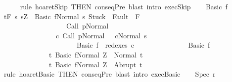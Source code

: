 \begin{isabellebody}
\ \ \ \ \isamarkupfalse%
\ {\isacharparenleft}rule\ hoaret{\isachardot}Skip\ {\isacharbrackleft}THEN\ conseqPre{\isacharbrackright}{\isacharparenright}\ {\isacharparenleft}blast\ intro{\isacharcolon}\ exec{\isachardot}Skip{\isacharparenright}\isanewline
{}\isamarkupfalse%
\isanewline
\ \ \isamarkupfalse%
\ {\isacharparenleft}Basic\ f{\isacharparenright}\isanewline
\ \ \isamarkupfalse%
\ {\isachardoublequoteopen}{\isasymGamma}{\isacharcomma}{\isasymTheta}{\isasymturnstile}\isactrlsub t\isactrlbsub {\isacharslash}F\isactrlesub \ {\isacharbraceleft}s{\isachardot}\ s{\isacharequal}Z\ {\isasymand}\ {\isasymGamma}{\isasymturnstile}{\isasymlangle}Basic\ f{\isacharcomma}Normal\ s{\isasymrangle}\ {\isasymRightarrow}{\isasymnotin}{\isacharparenleft}{\isacharbraceleft}Stuck{\isacharbraceright}\ {\isasymunion}\ Fault\ {\isacharbackquote}\ {\isacharparenleft}{\isacharminus}F{\isacharparenright}{\isacharparenright}\ {\isasymand}\ \isanewline
\ \ \ \ \ \ \ \ \ \ \ \ \ \ \ \ \ \ \ {\isasymGamma}{\isasymturnstile}Call\ p{\isasymdown}Normal\ {\isasymsigma}\ {\isasymand}\isanewline
\ \ \ \ \ \ \ \ \ \ \ \ \ \ \ \ {\isacharparenleft}{\isasymexists}c{\isacharprime}{\isachardot}\ {\isasymGamma}{\isasymturnstile}{\isacharparenleft}Call\ p{\isacharcomma}Normal\ {\isasymsigma}{\isacharparenright}\ {\isasymrightarrow}\isactrlsup {\isacharplus}\ {\isacharparenleft}c{\isacharprime}{\isacharcomma}Normal\ s{\isacharparenright}\ {\isasymand}\ \isanewline
\ \ \ \ \ \ \ \ \ \ \ \ \ \ \ \ \ \ \ \ \ \ Basic\ f\ {\isasymin}\ redexes\ c{\isacharprime}{\isacharparenright}{\isacharbraceright}\isanewline
\ \ \ \ \ \ \ \ \ \ \ \ \ \ \ Basic\ f\ \isanewline
\ \ \ \ \ \ \ \ \ \ \ \ \ \ {\isacharbraceleft}t{\isachardot}\ {\isasymGamma}{\isasymturnstile}{\isasymlangle}Basic\ f{\isacharcomma}Normal\ Z{\isasymrangle}\ {\isasymRightarrow}\ Normal\ t{\isacharbraceright}{\isacharcomma}\isanewline
\ \ \ \ \ \ \ \ \ \ \ \ \ \ {\isacharbraceleft}t{\isachardot}\ {\isasymGamma}{\isasymturnstile}{\isasymlangle}Basic\ f{\isacharcomma}Normal\ Z{\isasymrangle}\ {\isasymRightarrow}\ Abrupt\ t{\isacharbraceright}{\isachardoublequoteclose}\isanewline
\ \ \ \ \isamarkupfalse%
\ {\isacharparenleft}rule\ hoaret{\isachardot}Basic\ {\isacharbrackleft}THEN\ conseqPre{\isacharbrackright}{\isacharparenright}\ {\isacharparenleft}blast\ intro{\isacharcolon}\ exec{\isachardot}Basic{\isacharparenright}\isanewline
{}\isamarkupfalse%
\isanewline
\ \ \isamarkupfalse%
\ {\isacharparenleft}Spec\ r{\isacharparenright}\isanewline

\end{isabellebody}
